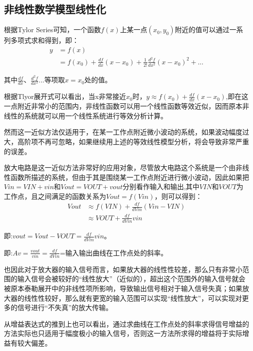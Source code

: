 \documentclass{article}
\numberwithin{equation}{section}
\numberwithin{figure}{section}
\begin{document}
\subsection{非线性数学模型线性化}
根据Tylor Series可知，一个函数$f(x)$上某一点$(x_0,y_0)$附近的值可以通过一系列多项式求和得到，即：
\begin{equation}
    \begin{split}
        y&=f(x)\\
        &=f(x_0)+\frac{df}{dx}(x-x_0)+\frac{1}{2!}\frac{d^2f}{dx^2}(x-x_0)^2+...
    \end{split}
\end{equation}

其中$\frac{df}{dx}、\frac{d^2f}{dx^2}...$等项取$x=x_0$处的值。

根据Tlyor展开式可以看出，当x非常接近$x_0$时，$y≈f(x_0)+\frac{df}{dx}(x-x_0)$,即在这一点附近非常小的范围内，非线性函数可以用一个线性函数等效近似，因而原本非线性的系统就可以用一个线性系统进行等效分析计算。

然而这一近似方法仅适用于，在某一工作点附近微小波动的系统，如果波动幅度过大，高阶项不再可忽略，如果继续用上述的等效线性模型分析，将会导致非常严重的误差。

放大电路是这一近似方法非常好的应用对象，尽管放大电路这个系统是一个由非线性函数所描述的系统，但由于其是围绕某一工作点附近进行微小波动，因此如果把$Vin=VIN+vin$和$Vout=VOUT+vout$分别看作输入和输出,其中$VIN$和$VOUT$为工作点，且之间满足的函数关系为$Vout=f(Vin)$，则可以得到：
\begin{equation}
    \begin{split}
        Vout&≈f(VIN)+\frac{df}{dVin}(Vin-VIN)\\
        &≈VOUT+\frac{df}{dVin}vin
    \end{split}
\end{equation}

即:$vout=Vout-VOUT=\frac{df}{dVin}vin$。

即:$Av=\frac{vout}{vin}=\frac{df}{dVin}$=输入输出曲线在工作点处的斜率。

也因此对于放大器的输入信号而言，如果放大器的线性性较差，那么只有非常小范围的输入信号会被较好的“线性放大”（近似的），超出这个范围外的输入信号就会被原本泰勒展开中的非线性项所影响，导致输出信号相对于输入信号失真；如果放大器的线性性较好，那么就有更宽的输入范围可以实现“线性放大”，可以实现对更多的信号进行“不失真”的放大传输。

从增益表达式的推到上也可以看出，通过求曲线在工作点处的斜率求得信号增益的方法实际也只适用于幅度极小的输入信号，否则这一方法所求得的增益将于实际增益有较大偏差。
\end{document}
